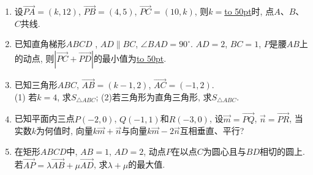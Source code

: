 \documentclass[10pt,a4paper]{article}
\newcommand{\blank}[1]{\underline{\hbox to #1pt{}}}
\begin{document}
\begin{enumerate}[1.]
\item 设$\overrightarrow{PA}=(k,12)$, $\overrightarrow{PB}=(4,5)$, $\overrightarrow{PC}=(10,k)$, 则$k=$\blank{50}时, 点$A$、$B$、$C$共线.
\item 已知直角梯形$ABCD$ , $AD\parallel BC$, $\angle BAD=90^\circ$. $AD=2$, $BC=1$, $P$是腰$AB$上的动点, 则$|\overrightarrow{PC}+\overrightarrow{PD}|$的最小值为\blank{50}.
\item 已知三角形$ABC$, $\overrightarrow{AB}=(k-1,2)$, $\overrightarrow{AC}=(-1,2)$.\\
(1) 若$k=4$, 求$S_{\triangle ABC}$; (2)若三角形为直角三角形, 求$S_{\triangle ABC}$.
\item 已知平面内三点$P(-2,0)$, $Q(-1,1)$和$R(-3,0)$, 设$\overrightarrow m=\overrightarrow{PQ}$, $\overrightarrow n=\overrightarrow{PR}$, 当实数$k$为何值时, 向量$k\overrightarrow m+\overrightarrow n$与向量$k\overrightarrow m-2\overrightarrow n$互相垂直、平行?
\item 在矩形$ABCD$中, $AB=1$, $AD=2$, 动点$P$在以点$C$为圆心且与$BD$相切的圆上. 若$\overrightarrow{AP}=\lambda \overrightarrow{AB}+\mu \overrightarrow{AD}$, 求$\lambda +\mu$的最大值.




\end{enumerate}
\end{document}
